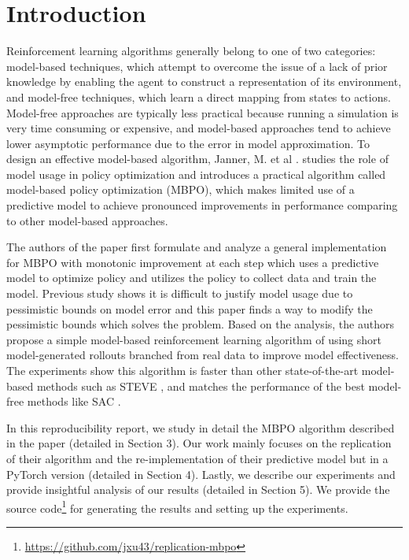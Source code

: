 \section{Introduction}

Reinforcement learning algorithms generally belong to one of two categories: model-based techniques, which attempt to overcome the issue of a lack of prior knowledge by enabling the agent to construct a representation of its environment, and model-free techniques, which learn a direct mapping from states to actions. Model-free approaches are typically less practical because running a simulation is very time consuming or expensive, and model-based approaches tend to achieve lower asymptotic performance due to the error in model approximation. To design an effective model-based algorithm, Janner, M. et al \cite{janner2019trust}. studies the role of model usage in policy optimization and introduces a practical algorithm called model-based policy optimization (MBPO), which makes limited use of a predictive model to achieve pronounced improvements in performance comparing to other model-based approaches.

The authors of the paper \cite{janner2019trust} first formulate and analyze a general implementation for MBPO with monotonic improvement at each step which uses a predictive model to optimize policy and utilizes the policy to collect data and train the model. Previous study shows it is difficult to justify model usage due to pessimistic bounds on model error and this paper finds a way to modify the pessimistic bounds which solves the problem. Based on the analysis, the authors propose a simple model-based reinforcement learning algorithm of using short model-generated rollouts branched from real data to improve model effectiveness. The experiments show this algorithm is faster than other state-of-the-art model-based methods such as STEVE \cite{NIPS2018_8044}, and matches the performance of the best model-free methods like SAC \cite{haarnoja2018soft}.

In this reproducibility report, we study in detail the MBPO algorithm described in the paper (detailed in Section 3). Our work mainly focuses on the replication of their algorithm and the re-implementation of their predictive model but in a PyTorch version (detailed in Section 4). Lastly, we describe our experiments and provide insightful analysis of our results (detailed in Section 5). We provide the source code\footnote{\url{https://github.com/jxu43/replication-mbpo}} for generating the results and setting up the experiments.

